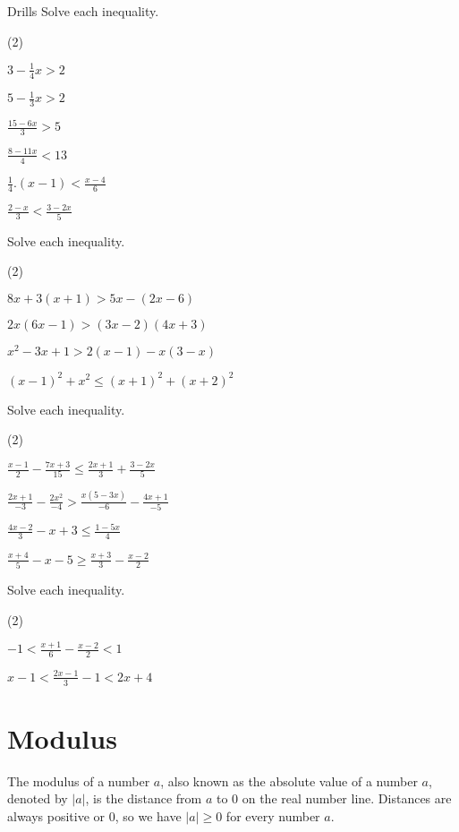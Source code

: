 \begin{questions}{Drills}
Solve each inequality.
\begin{question_set}(2)
    \item $3-\frac{1}{4}x>2$
    \item $5-\frac{1}{3}x>2$
    \item $\frac{15-6x}{3}>5$
    \item $\frac{8-11x}{4}<13$
    \item $\frac{1}{4}.(x-1)<\frac{x-4}{6}$
    \item $\frac{2-x}{3}<\frac{3-2x}{5}$
\end{question_set}
Solve each inequality.
\begin{question_set}(2)
    \item $8x+3(x+1)>5x-(2x-6)$
    \item $2x(6x-1)>(3x-2)(4x+3)$
    \item $x^{2}-3x+1>2(x-1)-x(3-x)$
    \item $(x-1)^{2}+x^{2}\leq (x+1)^{2}+(x+2)^{2}$ %
\end{question_set}
Solve each inequality.
\begin{question_set}(2)
    \item $\frac{x-1}{2}-\frac{7x+3}{15}\leq \frac{2x+1}{3}+\frac{3-2x}{5}$
    \item $\frac{2x+1}{-3}-\frac{2x^{2}}{-4}>\frac{x(5-3x)}{-6}-\frac{4x+1}{-5}$
    \item $\frac{4x-2}{3}-x+3 \leq \frac{1-5x}{4}$
    \item $\frac{x+4}{5}-x-5\geq \frac{x+3}{3}-\frac{x-2}{2}$
\end{question_set}
Solve each inequality.
\begin{question_set} (2)
    \item $-1<\frac{x+1}{6}-\frac{x-2}{2}<1$
    \item $x-1<\frac{2x-1}{3}-1<2x+4$
\end{question_set}
\end{questions}

\section{Modulus}
The modulus of a number $a$, also known as the absolute value of a number $a$, denoted by $|a|$, is the distance from $a$ to 0 on the real number line. Distances are always positive or 0, so we have $|a|\geq 0$ for every number $a$. %